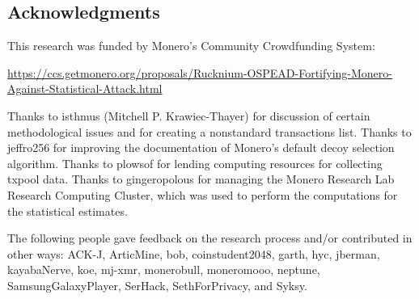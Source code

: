 \documentclass[english]{article}
\begin{document}
\subsection*{Acknowledgments}

This research was funded by Monero's Community Crowdfunding System: 

\href{https://ccs.getmonero.org/proposals/Rucknium-OSPEAD-Fortifying-Monero-Against-Statistical-Attack.html}{https://ccs.getmonero.org/proposals/Rucknium-OSPEAD-Fortifying-Monero-Against-Statistical-Attack.html}

Thanks to isthmus (Mitchell P. Krawiec-Thayer) for discussion of certain
methodological issues and for creating a nonstandard transactions
list. Thanks to jeffro256 for improving the documentation of Monero's
default decoy selection algorithm. Thanks to plowsof for lending computing
resources for collecting txpool data. Thanks to gingeropolous for
managing the Monero Research Lab Research Computing Cluster, which
was used to perform the computations for the statistical estimates.

The following people gave feedback on the research process and/or
contributed in other ways: ACK-J, ArticMine, bob, coinstudent2048,
garth, hyc, jberman, kayabaNerve, koe, mj-xmr, monerobull, moneromooo,
neptune, SamsungGalaxyPlayer, SerHack, SethForPrivacy, and Syksy.

\pagebreak{}

\begin{singlespace}

\end{singlespace}
\end{document}
